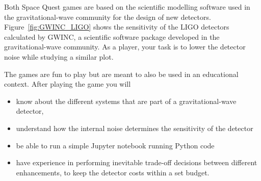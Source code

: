 \documentclass{article}
\begin{document}
Both Space Quest games are based on the scientific modelling software 
used in the gravitational-wave community for the design of new
detectors. Figure~\ref{fig:GWINC_LIGO} 
shows the sensitivity of the LIGO detectors calculated by GWINC, 
a scientific software package developed in the gravitational-wave
community. As a player, your task is to lower the detector noise 
while studying a similar plot. 

The games are fun to play but are meant to also be used in an
educational context. After playing the game you will
\begin{itemize}
\item know about the different systems that are part of  a
  gravitational-wave detector,
\item understand how the internal noise determines the
  sensitivity of the detector
\item be able to run a simple Jupyter notebook running Python code
\item have experience in performing inevitable trade-off decisions
  between different enhancements, to keep the detector costs within a set budget.
\end{itemize}
\end{document}
